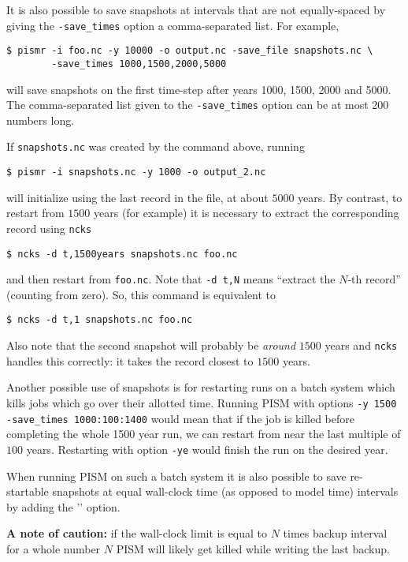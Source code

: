 It is also possible to save snapshots at intervals that are not equally-spaced
by giving the \texttt{-save_times} option a comma-separated list. For example,
\begin{verbatim}
$ pismr -i foo.nc -y 10000 -o output.nc -save_file snapshots.nc \
        -save_times 1000,1500,2000,5000
\end{verbatim}
will save snapshots on the first time-step after years 1000, 1500, 2000 and 5000.
The comma-separated list given to the \texttt{-save_times} option can be at most 200 numbers long.

If \texttt{snapshots.nc} was created by the command above, running
\begin{verbatim}
$ pismr -i snapshots.nc -y 1000 -o output_2.nc
\end{verbatim}
will initialize using the last record in the file, at about $5000$ years.  By contrast, to restart from $1500$ years (for example) it is necessary to extract the corresponding record using \texttt{ncks}
\begin{verbatim}
$ ncks -d t,1500years snapshots.nc foo.nc
\end{verbatim}
and then restart from \texttt{foo.nc}.  Note that \texttt{-d t,N} means ``extract the $N$-th record'' (counting from zero).  So, this command is equivalent to
\begin{verbatim}
$ ncks -d t,1 snapshots.nc foo.nc
\end{verbatim}
Also note that the second snapshot will probably be \emph{around} $1500$ years and \texttt{ncks} handles this correctly: it takes the record closest to $1500$ years.

Another possible use of snapshots is for restarting runs on a batch system which kills jobs which go over their allotted time.  Running PISM with options \texttt{-y 1500} \texttt{-save_times 1000:100:1400} would mean that if the job is killed before completing the whole 1500 year run, we can restart from near the last multiple of $100$ years.  Restarting with option \texttt{-ye} would finish the run on the desired year.

When running PISM on such a batch system it is also possible to save
re-startable snapshots at equal wall-clock time (as opposed to model time)
intervals by adding the '\txtopt{backup_interval}{hours}' option.

\textbf{A note of caution:} if the wall-clock limit is equal to $N$ times backup
interval for a whole number $N$ PISM will likely get killed while writing the
last backup.

